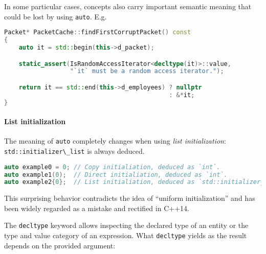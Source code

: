\documentclass[twoside,10pt,letterpaper,usenames]{newstyle-PearsonGeneric-7-38}
\newcommand{\passthrough}[1]{\texttt{#1}}
\begin{document}
In some particular cases, concepts also carry important semantic meaning
that could be lost by using \passthrough{\lstinline!auto!}. E.g.

\begin{lstlisting}[language=C++, caption={missing caption}, label={testlabel}, frame=tb]
Packet* PacketCache::findFirstCorruptPacket() const
{
    auto it = std::begin(this->d_packet);

    static_assert(IsRandomAccessIterator<decltype(it)>::value,
                  "`it` must be a random access iterator.");

    return it == std::end(this->d_employees) ? nullptr
                                             : &*it;
}
\end{lstlisting}
    

\paragraph[List initialization]{List initialization}\label{list-initialization}

The meaning of \passthrough{\lstinline!auto!} completely changes when
using \emph{list initialization}:
\passthrough{\lstinline!std::initializer\_list!} is always deduced.

\begin{lstlisting}[language=C++, caption={missing caption}, label={testlabel}, frame=tb]
auto example0 = 0; // Copy initialiation, deduced as `int`.
auto example1(0);  // Direct initialiation, deduced as `int`.
auto example2{0};  // List initialiation, deduced as `std::initializer_list<int>`.
\end{lstlisting}
    

This surprising behavior contradicts the idea of ``uniform
initialization'' and has been widely regarded as a mistake and rectified
in C++14.

The \passthrough{\lstinline!decltype!} keyword allows inspecting the
declared type of an entity or the type and value category of an
expression. What \passthrough{\lstinline!decltype!} yields as the result
depends on the provided argument:
\end{document}

